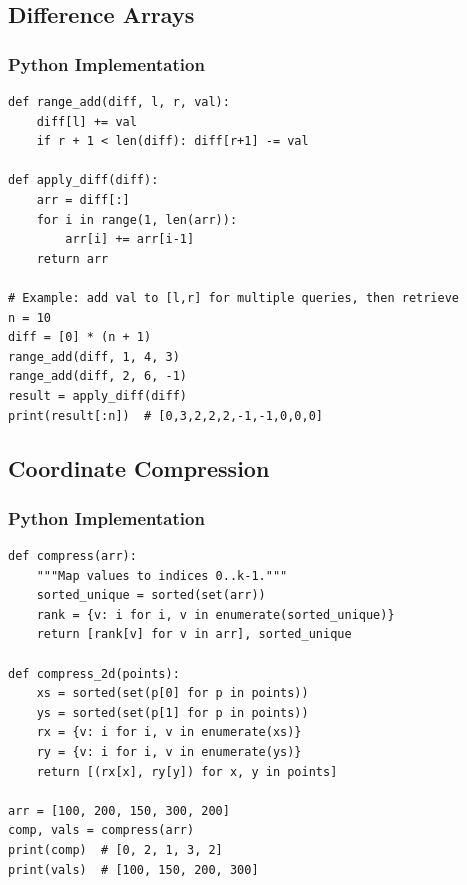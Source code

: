 \documentclass[10pt,a4paper]{article}
\theoremstyle{cpstyle}
\begin{document}
\subsection{Difference Arrays}

\subsubsection{Python Implementation}
\begin{lstlisting}[caption={Difference Arrays -- range update in O(1)}]
def range_add(diff, l, r, val):
    diff[l] += val
    if r + 1 < len(diff): diff[r+1] -= val

def apply_diff(diff):
    arr = diff[:]
    for i in range(1, len(arr)):
        arr[i] += arr[i-1]
    return arr

# Example: add val to [l,r] for multiple queries, then retrieve
n = 10
diff = [0] * (n + 1)
range_add(diff, 1, 4, 3)
range_add(diff, 2, 6, -1)
result = apply_diff(diff)
print(result[:n])  # [0,3,2,2,2,-1,-1,0,0,0]
\end{lstlisting}

\subsection{Coordinate Compression}

\subsubsection{Python Implementation}
\begin{lstlisting}[caption={Coordinate Compression}]
def compress(arr):
    """Map values to indices 0..k-1."""
    sorted_unique = sorted(set(arr))
    rank = {v: i for i, v in enumerate(sorted_unique)}
    return [rank[v] for v in arr], sorted_unique

def compress_2d(points):
    xs = sorted(set(p[0] for p in points))
    ys = sorted(set(p[1] for p in points))
    rx = {v: i for i, v in enumerate(xs)}
    ry = {v: i for i, v in enumerate(ys)}
    return [(rx[x], ry[y]) for x, y in points]

arr = [100, 200, 150, 300, 200]
comp, vals = compress(arr)
print(comp)  # [0, 2, 1, 3, 2]
print(vals)  # [100, 150, 200, 300]
\end{lstlisting}

\end{document}
